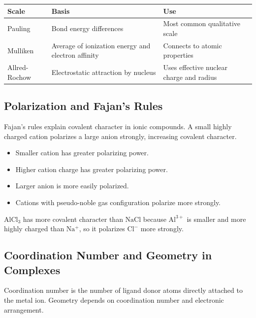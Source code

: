 \documentclass[12pt,a4paper]{article}
\begin{document}
\begin{tabularx}{\linewidth}{|B{3cm}|Y|Y|}
\hline
\textbf{Scale} & \textbf{Basis} & \textbf{Use} \\
\hline
Pauling & Bond energy differences & Most common qualitative scale \\
\hline
Mulliken & Average of ionization energy and electron affinity & Connects to atomic properties \\
\hline
Allred-Rochow & Electrostatic attraction by nucleus & Uses effective nuclear charge and radius \\
\hline
\end{tabularx}

\subsection{Polarization and Fajan's Rules}
Fajan's rules explain covalent character in ionic compounds. A small highly charged cation polarizes a large anion strongly, increasing covalent character.

\begin{tcolorbox}[masonbox, title={Fajan's Rules}]
\begin{itemize}[leftmargin=*, itemsep=2pt, topsep=2pt]
  \item Smaller cation has greater polarizing power.
  \item Higher cation charge has greater polarizing power.
  \item Larger anion is more easily polarized.
  \item Cations with pseudo-noble gas configuration polarize more strongly.
\end{itemize}
\end{tcolorbox}

\begin{tcolorbox}[examplebox, title={Solved Example: Covalent Character}]
$\mathrm{AlCl_3}$ has more covalent character than $\mathrm{NaCl}$ because $\mathrm{Al^{3+}}$ is smaller and more highly charged than $\mathrm{Na^+}$, so it polarizes $\mathrm{Cl^-}$ more strongly.
\end{tcolorbox}

\subsection{Coordination Number and Geometry in Complexes}
Coordination number is the number of ligand donor atoms directly attached to the metal ion. Geometry depends on coordination number and electronic arrangement.
\end{document}
